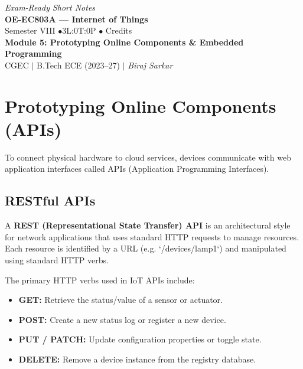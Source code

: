 \documentclass[12pt,a4paper]{article}
\begin{document}
\begin{center}
  \hfill \textit{Exam-Ready Short Notes} \\
  \vspace{6pt}
  {\LARGE\bfseries\color{myred} OE-EC803A --- Internet of Things}\\[5pt]
  {\normalsize\color{mydark} Semester VIII \quad$\bullet$\quad 3L:0T:0P \quad$\bullet$ Credits}\\[3pt]
  {\normalsize\color{myteal}\textbf{Module 5: Prototyping Online Components \& Embedded Programming}}\\[3pt]
  {\small\color{mydark} CGEC \;$|$\; B.Tech ECE (2023--27) \;$|$\; \textit{Biraj Sarkar}}
\end{center}
\vspace{2pt}
\noindent{\color{myred}\rule{\linewidth}{1.5pt}}
\vspace{2pt}

\hypersetup{linkcolor=mydark}
\tableofcontents
\hypersetup{linkcolor=myteal}
\newpage

\section{Prototyping Online Components (APIs)}

To connect physical hardware to cloud services, devices communicate with web application interfaces called APIs (Application Programming Interfaces).

\subsection{RESTful APIs}
\begin{tcolorbox}[defbox, title={REST API}]
  A \textbf{REST (Representational State Transfer) API} is an architectural style for network applications that uses standard HTTP requests to manage resources. Each resource is identified by a URL (e.g. `/devices/lamp1`) and manipulated using standard HTTP verbs.
\end{tcolorbox}
The primary HTTP verbs used in IoT APIs include:
\begin{itemize}[leftmargin=*, itemsep=2pt]
  \item \textbf{GET:} Retrieve the status/value of a sensor or actuator.
  \item \textbf{POST:} Create a new status log or register a new device.
  \item \textbf{PUT / PATCH:} Update configuration properties or toggle state.
  \item \textbf{DELETE:} Remove a device instance from the registry database.
\end{itemize}
\end{document}
